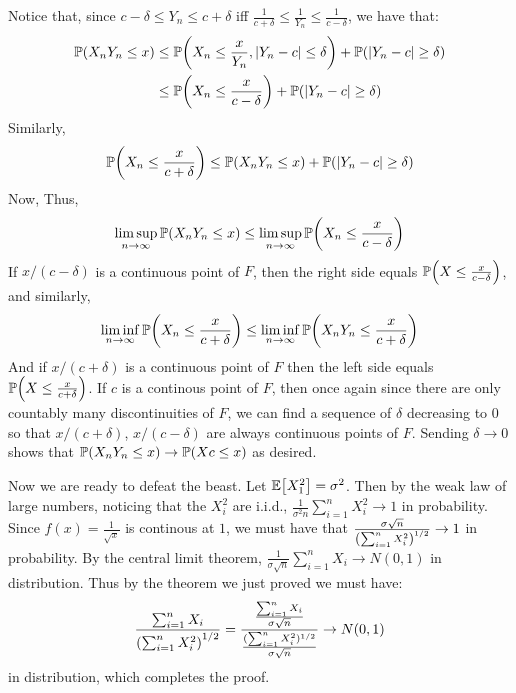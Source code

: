 \documentclass[12pt]{article}
\theoremstyle{definitionstyle}
\newcommand{\1}{\mathds 1}
\renewcommand{\P}{\mathbb P \qty}
\newcommand{\E}{\mathbb E \qty}
\begin{document}
\begin{enumerate}
        Notice that, since $c-\delta \leq Y_n \leq c+\delta$ iff $\frac{1}{c+\delta} \leq \frac{1}{Y_n} \leq \frac{1}{c-\delta}$, we have that:
        \begin{align*}
            \P(X_nY_n \leq x) &\leq \P(X_n \leq \frac{x}{Y_n}, |Y_n-c| \leq \delta) + \P(|Y_n - c| \geq \delta) \\
            &\leq \P(X_n \leq \frac{x}{c-\delta}) + \P(|Y_n-c| \geq \delta)
        \end{align*}
        Similarly,
        \begin{align*}
            \P(X_n \leq \frac{x}{c+\delta}) \leq \P(X_nY_n \leq x) + \P(|Y_n-c| \geq \delta)
        \end{align*}
        Now, 
        Thus,
        \begin{align*}
            \limsup_{n \to \infty} \P(X_nY_n \leq x) \leq \limsup_{n \to \infty} \P(X_n \leq \frac{x}{c-\delta})
        \end{align*}
        If $x/(c-\delta)$ is a continuous point of $F$, then the right side equals $\P(X \leq \frac{x}{c-\delta})$, and similarly,
        \begin{align*}
            \liminf_{n \to \infty} \P(X_n \leq \frac{x}{c+\delta}) \leq \liminf_{n \to \infty} \P(X_nY_n \leq \frac{x}{c+\delta})
        \end{align*}
        And if $x/(c+\delta)$ is a continuous point of $F$ then the left side equals $\P(X \leq \frac{x}{c+\delta})$. If $c$ is a continous point of $F$, then once again since there are only countably many discontinuities of $F$, we can find a sequence of $\delta$ decreasing to $0$ so that $x/(c+\delta)$, $x/(c-\delta)$ are always continuous points of $F$. Sending $\delta \to 0$ shows that $\P(X_nY_n \leq x) \to \P(Xc \leq x)$ as desired. 

        Now we are ready to defeat the beast. Let $\E[X_1^2] = \sigma^2$. Then by the weak law of large numbers, noticing that the $X_i^2$ are i.i.d., $\frac 1{\sigma^2n} \sum_{i=1}^n X_i^2 \to 1$ in probability. Since $f(x)=\frac{1}{\sqrt{x}}$ is continous at $1$, we must have that $\frac{\sigma \sqrt{n}}{\qty(\sum_{i=1}^n X_i^2)^{1/2}} \to 1$ in probability. By the central limit theorem, $\frac{1}{\sigma \sqrt{n}} \sum_{i=1}^n X_i \to N(0,1)$ in distribution. Thus by the theorem we just proved we must have:
        \begin{align*}
            \frac{\sum_{i=1}^n X_i}{\qty(\sum_{i=1}^n X_i^2)^{1/2}} = \frac{\frac{\sum_{i=1}^n X_i}{\sigma \sqrt{n}}}{\frac{(\sum_{i=1}^n X_i^2)^{1/2}}{\sigma \sqrt{n}}} \to N(0,1)
        \end{align*}
        in distribution, which completes the proof.
    \end{enumerate}
\end{document}
